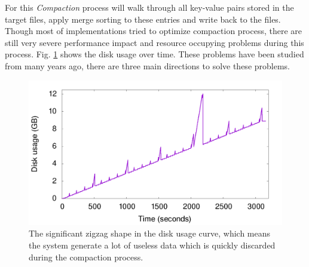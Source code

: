 For this \textit{Compaction} process will walk through all key-value pairs stored in the target files, apply merge sorting to these entries and write back to the files. Though most of implementations tried to optimize compaction process, there are still very severe performance impact and resource occupying problems during this process. Fig. \ref{fig:disk_usage} shows the disk usage over time. These problems have been studied from many years ago, there are three main directions to solve these problems. 

\begin{figure}
	\centering
	\includegraphics[width=0.9\columnwidth]{fig/compaction-2}
	\caption{The significant zigzag shape in the disk usage curve, which means the system generate a lot of useless data which is quickly discarded during the compaction process.}
	\label{fig:disk_usage}
\end{figure}

